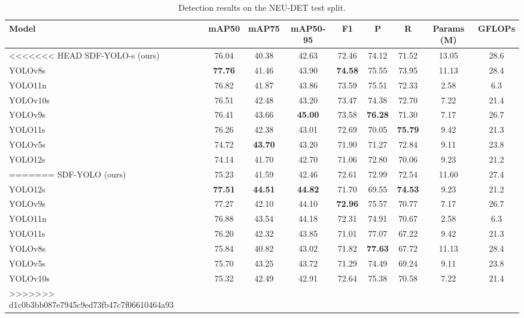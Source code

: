 \begin{table}[t]\centering\small
\caption{Detection results on the NEU-DET test split.}
\begin{tabular}{lcccccccc}\toprule
Model & mAP50 & mAP75 & mAP50-95 & F1 & P & R & Params (M) & GFLOPs \\ \midrule
<<<<<<< HEAD
SDF-YOLO-s (ours) & 76.04 & 40.38 & 42.63 & 72.46 & 74.12 & 71.52 & 13.05 & 28.6 \\
YOLOv8s & \textbf{77.76} & 41.46 & 43.90 & \textbf{74.58} & 75.55 & 73.95 & 11.13 & 28.4 \\
YOLO11n & 76.82 & 41.87 & 43.86 & 73.59 & 75.51 & 72.33 & 2.58 & 6.3 \\
YOLOv10s & 76.51 & 42.48 & 43.20 & 73.47 & 74.38 & 72.70 & 7.22 & 21.4 \\
YOLOv9s & 76.41 & 43.66 & \textbf{45.00} & 73.58 & \textbf{76.28} & 71.30 & 7.17 & 26.7 \\
YOLO11s & 76.26 & 42.38 & 43.01 & 72.69 & 70.05 & \textbf{75.79} & 9.42 & 21.3 \\
YOLOv5s & 74.72 & \textbf{43.70} & 43.20 & 71.90 & 71.27 & 72.84 & 9.11 & 23.8 \\
YOLO12s & 74.14 & 41.70 & 42.70 & 71.06 & 72.80 & 70.06 & 9.23 & 21.2 \\
=======
SDF-YOLO (ours) & 75.23 & 41.59 & 42.46 & 72.61 & 72.99 & 72.54 & 11.60 & 27.4 \\
YOLO12s & \textbf{77.51} & \textbf{44.51} & \textbf{44.82} & 71.70 & 69.55 & \textbf{74.53} & 9.23 & 21.2 \\
YOLOv9s & 77.27 & 42.10 & 44.10 & \textbf{72.96} & 75.57 & 70.77 & 7.17 & 26.7 \\
YOLO11n & 76.88 & 43.54 & 44.18 & 72.31 & 74.91 & 70.67 & 2.58 & 6.3 \\
YOLO11s & 76.20 & 42.32 & 43.85 & 71.01 & 77.07 & 67.22 & 9.42 & 21.3 \\
YOLOv8s & 75.84 & 40.82 & 43.02 & 71.82 & \textbf{77.63} & 67.72 & 11.13 & 28.4 \\
YOLOv5s & 75.70 & 43.25 & 43.72 & 71.29 & 74.49 & 69.24 & 9.11 & 23.8 \\
YOLOv10s & 75.32 & 42.49 & 42.91 & 72.64 & 75.38 & 70.58 & 7.22 & 21.4 \\
>>>>>>> d1c0b3bb087e7945c9ed73fb47c7f06610464a93
\bottomrule\end{tabular}\end{table}

